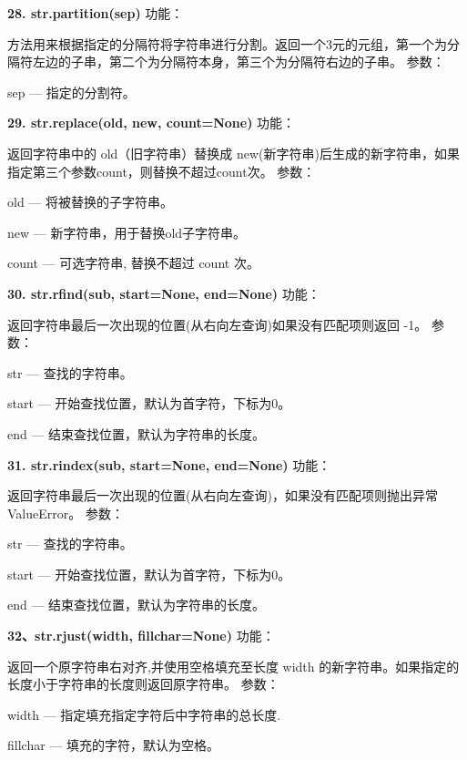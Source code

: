 \documentclass{book}
\begin{document}
\begin{CJK}{UTF8}{gbsn}
\noindent \textbf{28. str.partition(sep)} \newline
功能：\par 方法用来根据指定的分隔符将字符串进行分割。返回一个3元的元组，第一个为分隔符左边的子串，第二个为分隔符本身，第三个为分隔符右边的子串。\newline
参数：\par sep --- 指定的分割符。
\newline

\noindent \textbf{29. str.replace(old, new, count=None)} \newline
功能：\par 返回字符串中的 old（旧字符串）替换成 new(新字符串)后生成的新字符串，如果指定第三个参数count，则替换不超过count次。\newline
参数：\par old --- 将被替换的子字符串。
     \par new --- 新字符串，用于替换old子字符串。
     \par count --- 可选字符串, 替换不超过 count 次。
\newline

\noindent \textbf{30. str.rfind(sub, start=None, end=None)} \newline
功能：\par 返回字符串最后一次出现的位置(从右向左查询)如果没有匹配项则返回
-1。\newline
参数：\par str --- 查找的字符串。
     \par start --- 开始查找位置，默认为首字符，下标为0。
     \par end --- 结束查找位置，默认为字符串的长度。
\newline

\noindent \textbf{31. str.rindex(sub, start=None, end=None)} \newline
功能：\par 返回字符串最后一次出现的位置(从右向左查询)，如果没有匹配项则抛出异常ValueError。\newline
参数：\par str --- 查找的字符串。
     \par start --- 开始查找位置，默认为首字符，下标为0。
     \par end --- 结束查找位置，默认为字符串的长度。
\newline

\noindent \textbf{32、str.rjust(width, fillchar=None)} \newline
功能：\par 返回一个原字符串右对齐,并使用空格填充至长度 width 的新字符串。如果指定的长度小于字符串的长度则返回原字符串。\newline
参数：\par width --- 指定填充指定字符后中字符串的总长度.
	 \par fillchar --- 填充的字符，默认为空格。
\newline


\end{CJK}
\end{document}
